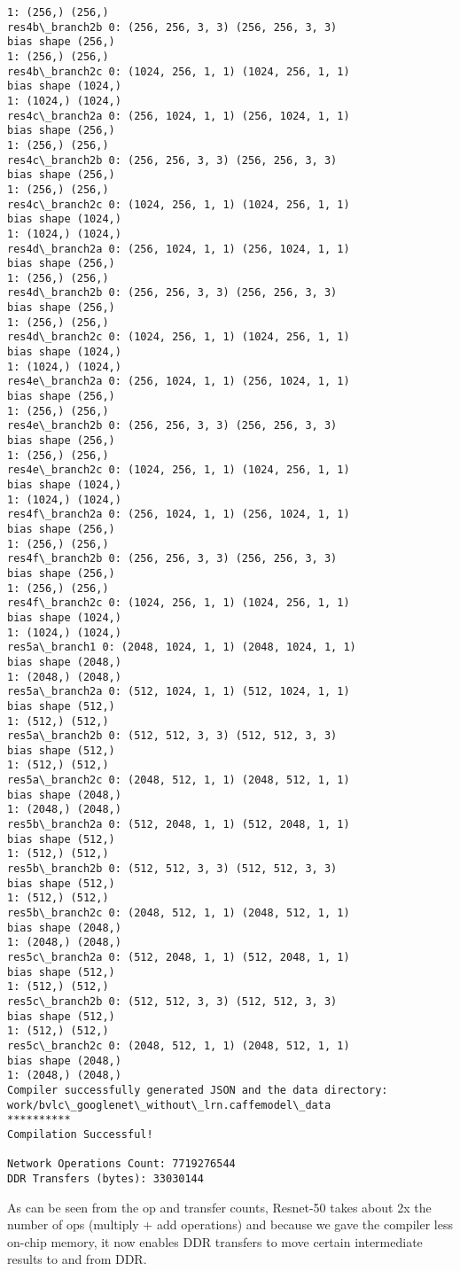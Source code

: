 \documentclass[11pt]{article}
\begin{document}
\begin{Verbatim}[commandchars=\\\{\}]
1: (256,) (256,)
res4b\_branch2b 0: (256, 256, 3, 3) (256, 256, 3, 3)
bias shape (256,)
1: (256,) (256,)
res4b\_branch2c 0: (1024, 256, 1, 1) (1024, 256, 1, 1)
bias shape (1024,)
1: (1024,) (1024,)
res4c\_branch2a 0: (256, 1024, 1, 1) (256, 1024, 1, 1)
bias shape (256,)
1: (256,) (256,)
res4c\_branch2b 0: (256, 256, 3, 3) (256, 256, 3, 3)
bias shape (256,)
1: (256,) (256,)
res4c\_branch2c 0: (1024, 256, 1, 1) (1024, 256, 1, 1)
bias shape (1024,)
1: (1024,) (1024,)
res4d\_branch2a 0: (256, 1024, 1, 1) (256, 1024, 1, 1)
bias shape (256,)
1: (256,) (256,)
res4d\_branch2b 0: (256, 256, 3, 3) (256, 256, 3, 3)
bias shape (256,)
1: (256,) (256,)
res4d\_branch2c 0: (1024, 256, 1, 1) (1024, 256, 1, 1)
bias shape (1024,)
1: (1024,) (1024,)
res4e\_branch2a 0: (256, 1024, 1, 1) (256, 1024, 1, 1)
bias shape (256,)
1: (256,) (256,)
res4e\_branch2b 0: (256, 256, 3, 3) (256, 256, 3, 3)
bias shape (256,)
1: (256,) (256,)
res4e\_branch2c 0: (1024, 256, 1, 1) (1024, 256, 1, 1)
bias shape (1024,)
1: (1024,) (1024,)
res4f\_branch2a 0: (256, 1024, 1, 1) (256, 1024, 1, 1)
bias shape (256,)
1: (256,) (256,)
res4f\_branch2b 0: (256, 256, 3, 3) (256, 256, 3, 3)
bias shape (256,)
1: (256,) (256,)
res4f\_branch2c 0: (1024, 256, 1, 1) (1024, 256, 1, 1)
bias shape (1024,)
1: (1024,) (1024,)
res5a\_branch1 0: (2048, 1024, 1, 1) (2048, 1024, 1, 1)
bias shape (2048,)
1: (2048,) (2048,)
res5a\_branch2a 0: (512, 1024, 1, 1) (512, 1024, 1, 1)
bias shape (512,)
1: (512,) (512,)
res5a\_branch2b 0: (512, 512, 3, 3) (512, 512, 3, 3)
bias shape (512,)
1: (512,) (512,)
res5a\_branch2c 0: (2048, 512, 1, 1) (2048, 512, 1, 1)
bias shape (2048,)
1: (2048,) (2048,)
res5b\_branch2a 0: (512, 2048, 1, 1) (512, 2048, 1, 1)
bias shape (512,)
1: (512,) (512,)
res5b\_branch2b 0: (512, 512, 3, 3) (512, 512, 3, 3)
bias shape (512,)
1: (512,) (512,)
res5b\_branch2c 0: (2048, 512, 1, 1) (2048, 512, 1, 1)
bias shape (2048,)
1: (2048,) (2048,)
res5c\_branch2a 0: (512, 2048, 1, 1) (512, 2048, 1, 1)
bias shape (512,)
1: (512,) (512,)
res5c\_branch2b 0: (512, 512, 3, 3) (512, 512, 3, 3)
bias shape (512,)
1: (512,) (512,)
res5c\_branch2c 0: (2048, 512, 1, 1) (2048, 512, 1, 1)
bias shape (2048,)
1: (2048,) (2048,)
Compiler successfully generated JSON and the data directory: work/bvlc\_googlenet\_without\_lrn.caffemodel\_data
**********
Compilation Successful!

Network Operations Count: 7719276544
DDR Transfers (bytes): 33030144

    \end{Verbatim}

    As can be seen from the op and transfer counts, Resnet-50 takes about 2x
the number of ops (multiply + add operations) and because we gave the
compiler less on-chip memory, it now enables DDR transfers to move
certain intermediate results to and from DDR.
\end{document}
